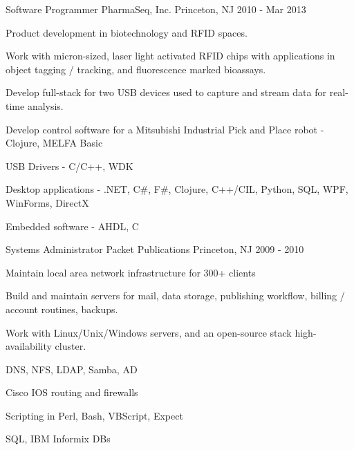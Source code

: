 \documentclass[11pt, letterpaper]{awesome-cv}
\begin{document}
\begin{cventries}
  \cventry
    {Software Programmer} %
    {PharmaSeq, Inc.} %
    {Princeton, NJ} %
    {2010 - Mar 2013} %
    {
      \begin{cvitems} 
        \item {Product development in biotechnology and RFID spaces.}
        \item {Work with micron-sized, laser light activated RFID chips with applications in object tagging / tracking, and fluorescence marked bioassays.}
        \item {Develop full-stack for two USB devices used to capture and stream data for real-time analysis.}
        \item {Develop control software for a Mitsubishi Industrial Pick and Place robot - Clojure, MELFA Basic}
        \item {USB Drivers - C/C++, WDK}
        \item {Desktop applications - .NET, C\#, F\#, Clojure, C++/CIL, Python, SQL, WPF, WinForms, DirectX}
        \item {Embedded software - AHDL, C}
      \end{cvitems}
    }

  \cventry
    {Systems Administrator} %
    {Packet Publications} %
    {Princeton, NJ} %
    {2009 - 2010} %
    {
      \begin{cvitems} %
        \item {Maintain local area network infrastructure for 300+ clients}
        \item {Build and maintain servers for mail, data storage, publishing workflow, billing / account routines, backups.}
        \item {Work with Linux/Unix/Windows servers, and an open-source stack high-availability cluster.}
        \item {DNS, NFS, LDAP, Samba, AD}
        \item {Cisco IOS routing and firewalls}
        \item {Scripting in Perl, Bash, VBScript, Expect}
        \item {SQL, IBM Informix DBs}
      \end{cvitems}
    }

\end{cventries}
\end{document}
